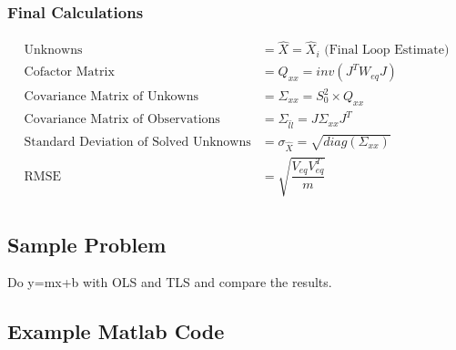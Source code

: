 \subsubsection{Final Calculations}
\begin{align*}
	\text{Unknowns} &= \hat{X} = \hat{X}_i \text{   (Final Loop Estimate)}\\
	\text{Cofactor Matrix} &= Q_{xx} = inv(J^TW_{eq}J) \\
	\text{Covariance Matrix of Unkowns} &= \Sigma_{xx} = S_0^2 \times Q_{xx} \\
	\text{Covariance Matrix of Observations} &= \Sigma_{\hat{l}\hat{l}} = J \Sigma_{xx} J^T \\
	\text{Standard Deviation of Solved Unknowns} &= \sigma_{\hat{X}} = \sqrt{diag(\Sigma_{xx})} \\
	\text{RMSE } &= \sqrt{\dfrac{V_{eq}V_{eq}^T}{m}} \\
\end{align*}
\clearpage
\subsection{Sample Problem}

Do y=mx+b with OLS and TLS and compare the results.

\subsection{Example Matlab Code}
